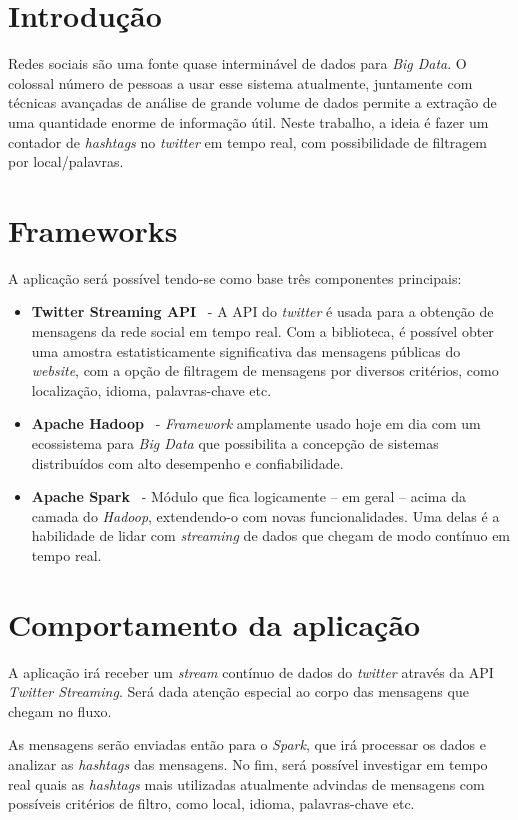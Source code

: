 \documentclass[11pt]{article}
\newcommand{\tit}[1]{\textit{#1}}
\newcommand{\tbf}[1]{\textbf{#1}}
\begin{document}
\begin{multicols}{2}

\section{Introdução}
Redes sociais são uma fonte quase interminável de dados para \tit{Big Data}.
O colossal número de pessoas a usar esse sistema atualmente, juntamente com
técnicas avançadas de análise de grande volume de dados permite a extração
de uma quantidade enorme de informação útil.
Neste trabalho, a ideia é fazer um contador de \tit{hashtags} no \tit{twitter}
em tempo real, com possibilidade de filtragem por local/palavras.

\section{Frameworks}
A aplicação será possível tendo-se como base três componentes principais:

\begin{itemize}
	\item \tbf{Twitter Streaming API}~\cite{twit-stream} - 
		A API do \tit{twitter} é usada para a obtenção de
		mensagens da rede social em tempo real. Com a biblioteca, é possível
		obter uma amostra estatisticamente significativa das mensagens
		públicas do \tit{website}, com a opção de filtragem de mensagens por
		diversos critérios, como localização, idioma, palavras-chave etc.

	\item \tbf{Apache Hadoop}~\cite{hadoop} -
		\tit{Framework} amplamente usado hoje em dia com um ecossistema para
		\tit{Big Data} que possibilita a concepção de sistemas distribuídos
		com alto desempenho e confiabilidade.

	\item \tbf{Apache Spark}~\cite{spark} -
		Módulo que fica logicamente -- em geral -- acima da camada do 
		\tit{Hadoop}, extendendo-o com novas funcionalidades. Uma delas é
		a habilidade de lidar com \tit{streaming} de dados que chegam de modo
		contínuo em tempo real.
\end{itemize}

\section{Comportamento da aplicação}
A aplicação irá receber um \tit{stream} contínuo de dados do \tit{twitter}
através da API \tit{Twitter Streaming}. Será dada atenção especial ao corpo
das mensagens que chegam no fluxo. 

As mensagens serão enviadas então para o \tit{Spark}, que irá processar os dados
e analizar as \tit{hashtags} das mensagens. 
No fim, será possível investigar em tempo real quais as \tit{hashtags} mais
utilizadas atualmente advindas de mensagens com possíveis critérios de filtro,
como local, idioma, palavras-chave etc.

\printbibliography

\end{multicols}
\end{document}
